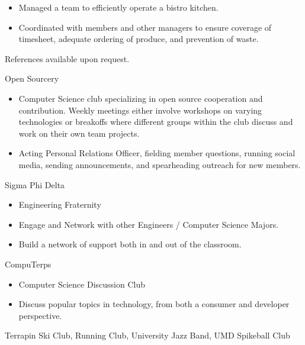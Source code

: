 \documentclass[11pt]{article}
\begin{document}
{\begin{itemize}
    \end{itemize}
    \vspace{3mm}
    \begin{itemize}[noitemsep,nolistsep]
        \item Managed a team to efficiently operate a bistro kitchen. 
        \item Coordinated with members and other managers to ensure coverage of timesheet, adequate ordering of produce, and prevention of waste.
    \end{itemize}
    \vspace{3mm}

\vspace{-2mm}
{\fontsize{8}{10}\robotocondlight References available upon request.}
}
\hsep


{\fontsize{10}{12}\robotocondlight
\noindent Open Sourcery
\begin{itemize}[noitemsep,nolistsep]
    \item Computer Science club specializing in open source cooperation and contribution. Weekly meetings either involve workshops on varying 
    technologies or breakoffs where different groups within the club discuss and work on their own team projects. 
    \item Acting Personal Relations Officer, fielding member questions, running social media, sending announcements, 
    and spearheading outreach for new members.
\end{itemize}
Sigma Phi Delta
\begin{itemize}[noitemsep,nolistsep]
    \item Engineering Fraternity
    \item Engage and Network with other Engineers / Computer Science Majors.
    \item Build a network of support both in and out of the classroom.
\end{itemize}
CompuTerps
\begin{itemize}[noitemsep,nolistsep]
    \item Computer Science Discussion Club
    \item Discuss popular topics in technology, from both a consumer and developer perspective. 
\end{itemize}
Terrapin Ski Club, Running Club, University Jazz Band, UMD Spikeball Club
}
\end{document}
